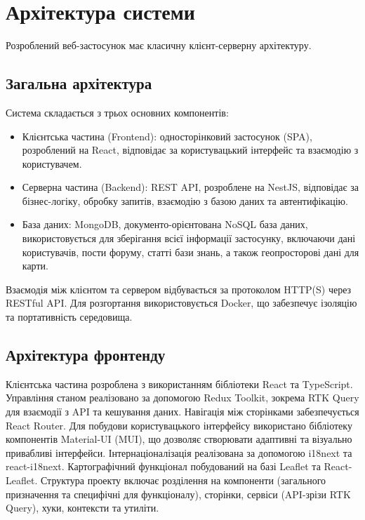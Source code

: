 \section{Архітектура системи}
\label{sec:architecture}
Розроблений веб-застосунок має класичну клієнт-серверну архітектуру. 

\subsection{Загальна архітектура}
Система складається з трьох основних компонентів: 
\begin{itemize}
    \item Клієнтська частина (Frontend): односторінковий застосунок (SPA), розроблений на React, відповідає за користувацький інтерфейс та взаємодію з користувачем.
    \item Серверна частина (Backend): REST API, розроблене на NestJS, відповідає за бізнес-логіку, обробку запитів, взаємодію з базою даних та автентифікацію.
    \item База даних: MongoDB, документо-орієнтована NoSQL база даних, використовується для зберігання всієї інформації застосунку, включаючи дані користувачів, пости форуму, статті бази знань, а також геопросторові дані для карти.
\end{itemize}
Взаємодія між клієнтом та сервером відбувається за протоколом HTTP(S) через RESTful API. Для розгортання використовується Docker, що забезпечує ізоляцію та портативність середовища.

\subsection{Архітектура фронтенду}
Клієнтська частина розроблена з використанням бібліотеки React та TypeScript. Управління станом реалізовано за допомогою Redux Toolkit, зокрема RTK Query для взаємодії з API та кешування даних. Навігація між сторінками забезпечується React Router. Для побудови користувацького інтерфейсу використано бібліотеку компонентів Material-UI (MUI), що дозволяє створювати адаптивні та візуально привабливі інтерфейси. Інтернаціоналізація реалізована за допомогою i18next та react-i18next. Картографічний функціонал побудований на базі Leaflet та React-Leaflet.
Структура проекту включає розділення на компоненти (загального призначення та специфічні для функціоналу), сторінки, сервіси (API-зрізи RTK Query), хуки, контексти та утиліти.

